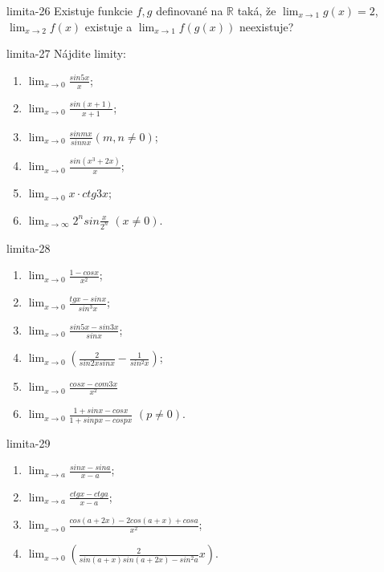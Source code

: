 \begin{defproblem}{limita-26}
Existuje funkcie $f,g$ definované na $\mathbb{R}$ taká, že $\lim_{x \rightarrow 1} g(x)=2$, $\lim_{x \rightarrow 2} f(x)$ existuje a $\lim_{x \rightarrow 1} f(g(x))$ neexistuje?
\end{defproblem}

\begin{defproblem}{limita-27}
Nájdite limity:
\begin{multicols}{2}
\begin{enumerate}
    \item $\lim_{x \rightarrow 0} \frac{sin 5x}{x}$;
    \item $\lim_{x \rightarrow 0} \frac{sin (x+1)}{x+1}$;
    \item $\lim_{x \rightarrow 0}  \frac{sin mx}{sin nx} (m,n \neq 0)$;
    \item $\lim_{x \rightarrow 0} \frac{sin (x^3+2x)}{x}$;
    \item $\lim_{x \rightarrow 0} x \cdot ctg 3x$;
    \item $\lim_{x \rightarrow \infty} 2^n sin \frac{x}{2^n}$  $(x \neq 0)$.
\end{enumerate}
\end{multicols}
\end{defproblem}

\begin{defproblem}{limita-28}
\begin{multicols}{2}
\begin{enumerate}
    \item $\lim_{{x \rightarrow 0}} \frac{1-cos x}{x^2}$;
    \item $\lim_{{x \rightarrow 0}} \frac{tg x-sin x}{sin ^3 x}$;
    \item $\lim_{{x \rightarrow 0}}  \frac{sin 5x-sin 3x}{sin x}$;
    \item $\lim_{{x \rightarrow 0}} (\frac{2}{sin 2x sin x}-\frac{1}{sin ^2 x})$;
    \item $\lim_{{x \rightarrow 0}} \frac{cos x - com 3x}{x^2} $
    \item $\lim_{x \rightarrow 0} \frac{1+sin x - cos x}{1+ sin px - cos px}$  $(p \neq 0)$.
\end{enumerate}
\end{multicols}
\end{defproblem}

\begin{defproblem}{limita-29}
\begin{multicols}{2}
\begin{enumerate}
    \item $\lim_{{x \rightarrow a}} \frac{sin x - sin a}{x-a}$;
    \item $\lim_{{x \rightarrow a}} \frac{ctg x - ctg a}{x-a}$;
    \item $\lim_{{x \rightarrow 0}}  \frac{cos (a+2x)-2 cos (a+x)+cos a}{x^2}$;
    \item $\lim_{{x \rightarrow 0}} (\frac{2}{sin (a+x) sin (a+2x)-sin ^2 a}{x})$.
\end{enumerate}
\end{multicols}
\end{defproblem}

